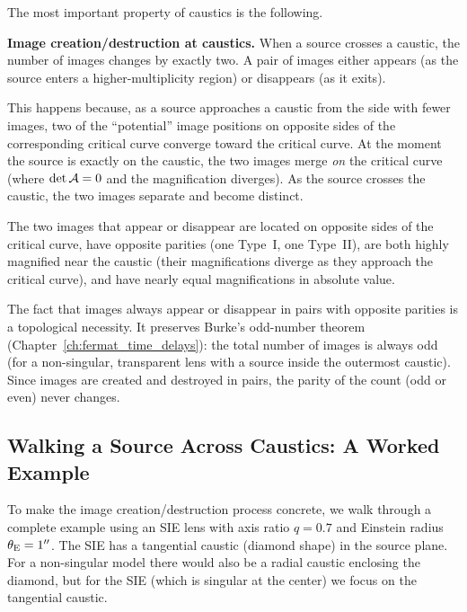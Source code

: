 The most important property of caustics is the following.

\begin{proposition}
\textbf{Image creation/destruction at caustics.}  When a source
crosses a caustic, the number of images changes by exactly two.  A
pair of images either appears (as the source enters a
higher-multiplicity region) or disappears (as it exits).
\end{proposition}

This happens because, as a source approaches a caustic from the side
with fewer images, two of the ``potential'' image positions on
opposite sides of the corresponding critical curve converge toward
the critical curve.  At the moment the source is exactly on the
caustic, the two images merge \textit{on} the critical curve (where
$\det\mathcal{A} = 0$ and the magnification diverges).  As the source
crosses the caustic, the two images separate and become distinct.

The two images that appear or disappear are located on opposite
sides of the critical curve, have opposite parities (one Type~I, one
Type~II), are both highly magnified near the caustic (their
magnifications diverge as they approach the critical curve), and
have nearly equal magnifications in absolute value.

\begin{remark}
The fact that images always appear or disappear in pairs
with opposite parities is a topological necessity.  It preserves
Burke's odd-number theorem
(Chapter~\ref{ch:fermat_time_delays}): the total number of images is
always odd (for a non-singular, transparent lens with a source
inside the outermost caustic).  Since images are created and
destroyed in pairs, the parity of the count (odd or even) never
changes.
\end{remark}


\subsection{Walking a Source Across Caustics: A Worked Example}
\label{sec:source_walk}

To make the image creation/destruction process concrete, we walk
through a complete example using an SIE lens with axis ratio
$q = 0.7$ and Einstein radius $\theta_{\mathrm{E}} = 1''$.  The SIE has a
tangential caustic (diamond shape) in the source plane.  For a
non-singular model there would also be a radial caustic enclosing
the diamond, but for the SIE (which is singular at the center) we
focus on the tangential caustic.

